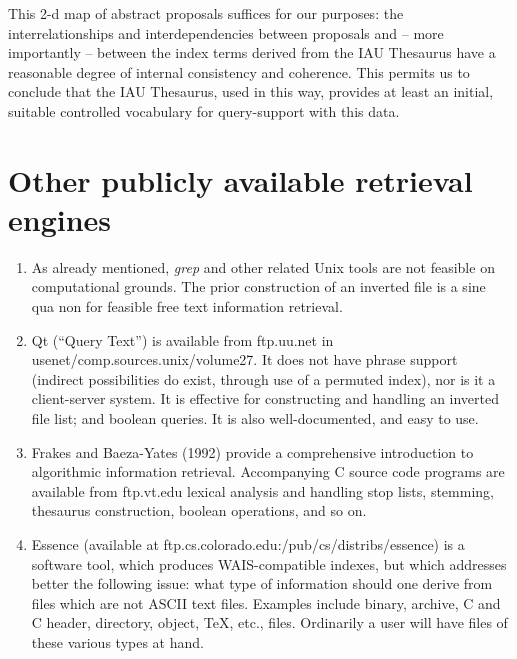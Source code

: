 This 2-d map of abstract proposals suffices for our purposes: the 
interrelationships and interdependencies between proposals and -- more
importantly --  between the index terms derived from the IAU Thesaurus
have a reasonable degree of internal consistency and coherence.  This
permits us to conclude that the IAU Thesaurus, used in this way, provides
at least an initial, suitable  controlled vocabulary for query-support
with this data.


\section{Other publicly available retrieval engines}

\begin{enumerate}

\item As already mentioned, {\it grep} 
and other related Unix tools are not feasible
on computational grounds.  The prior construction of an inverted file is a 
sine qua non for feasible free text information retrieval.

\item Qt (``Query Text'') is available from ftp.uu.net in 
usenet/comp.sources.unix/volume27.  It does not have phrase support 
(indirect possibilities do exist, through use of a permuted index), nor is
it a  client-server system.  It is effective for constructing and
handling an inverted file list; and boolean queries.  It is also 
well-documented, and easy to use.

\item Frakes and Baeza-Yates (1992) provide a comprehensive introduction to 
algorithmic information retrieval.  Accompanying C source code programs 
are available from ftp.vt.edu lexical analysis and handling stop lists,
stemming, thesaurus construction, boolean operations, and so on.  

\item Essence (available at ftp.cs.colorado.edu:/pub/cs/distribs/essence)
is a software tool, which produces WAIS-compatible indexes, but which 
addresses better the following issue: what type of information should one
derive from files which are not ASCII text files.  
Examples include binary, archive,
C and C header, directory, object, TeX, etc., files.  Ordinarily a user
will have files of these various types at hand. 



\end{enumerate}


